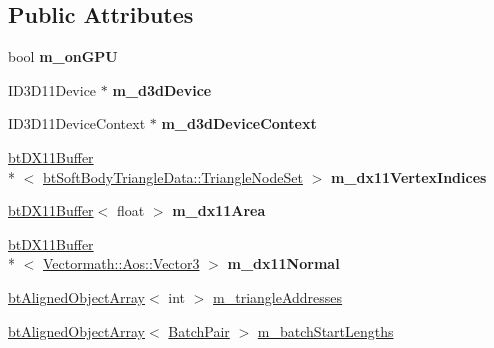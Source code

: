\subsection*{Public Attributes}
\begin{DoxyCompactItemize}
\item 
\hypertarget{classbt_soft_body_triangle_data_d_x11_a50ba14c102f8c80ec1c048c18131b137}{bool {\bfseries m\+\_\+on\+G\+P\+U}}\label{classbt_soft_body_triangle_data_d_x11_a50ba14c102f8c80ec1c048c18131b137}

\item 
\hypertarget{classbt_soft_body_triangle_data_d_x11_a262b4133f77dc204d3f91931c7933c69}{I\+D3\+D11\+Device $\ast$ {\bfseries m\+\_\+d3d\+Device}}\label{classbt_soft_body_triangle_data_d_x11_a262b4133f77dc204d3f91931c7933c69}

\item 
\hypertarget{classbt_soft_body_triangle_data_d_x11_aa5a8583bae18c4a2e1957623fb3f1eee}{I\+D3\+D11\+Device\+Context $\ast$ {\bfseries m\+\_\+d3d\+Device\+Context}}\label{classbt_soft_body_triangle_data_d_x11_aa5a8583bae18c4a2e1957623fb3f1eee}

\item 
\hypertarget{classbt_soft_body_triangle_data_d_x11_a19c1483e980e9aa33b2cf2434db1f057}{\hyperlink{classbt_d_x11_buffer}{bt\+D\+X11\+Buffer}\\*
$<$ \hyperlink{classbt_soft_body_triangle_data_1_1_triangle_node_set}{bt\+Soft\+Body\+Triangle\+Data\+::\+Triangle\+Node\+Set} $>$ {\bfseries m\+\_\+dx11\+Vertex\+Indices}}\label{classbt_soft_body_triangle_data_d_x11_a19c1483e980e9aa33b2cf2434db1f057}

\item 
\hypertarget{classbt_soft_body_triangle_data_d_x11_aa7aaaf91a45f0a77ef1cfd3c42b89f36}{\hyperlink{classbt_d_x11_buffer}{bt\+D\+X11\+Buffer}$<$ float $>$ {\bfseries m\+\_\+dx11\+Area}}\label{classbt_soft_body_triangle_data_d_x11_aa7aaaf91a45f0a77ef1cfd3c42b89f36}

\item 
\hypertarget{classbt_soft_body_triangle_data_d_x11_afb41ab8a75db9fdd1b6366dd4dc8633b}{\hyperlink{classbt_d_x11_buffer}{bt\+D\+X11\+Buffer}\\*
$<$ \hyperlink{class_vectormath_1_1_aos_1_1_vector3}{Vectormath\+::\+Aos\+::\+Vector3} $>$ {\bfseries m\+\_\+dx11\+Normal}}\label{classbt_soft_body_triangle_data_d_x11_afb41ab8a75db9fdd1b6366dd4dc8633b}

\item 
\hyperlink{classbt_aligned_object_array}{bt\+Aligned\+Object\+Array}$<$ int $>$ \hyperlink{classbt_soft_body_triangle_data_d_x11_a265feb3aa3cd4133ae22e94232213420}{m\+\_\+triangle\+Addresses}
\item 
\hyperlink{classbt_aligned_object_array}{bt\+Aligned\+Object\+Array}$<$ \hyperlink{structbt_soft_body_triangle_data_d_x11_1_1_batch_pair}{Batch\+Pair} $>$ \hyperlink{classbt_soft_body_triangle_data_d_x11_a656296170e5674fd89683db8c5b0948f}{m\+\_\+batch\+Start\+Lengths}
\end{DoxyCompactItemize}
